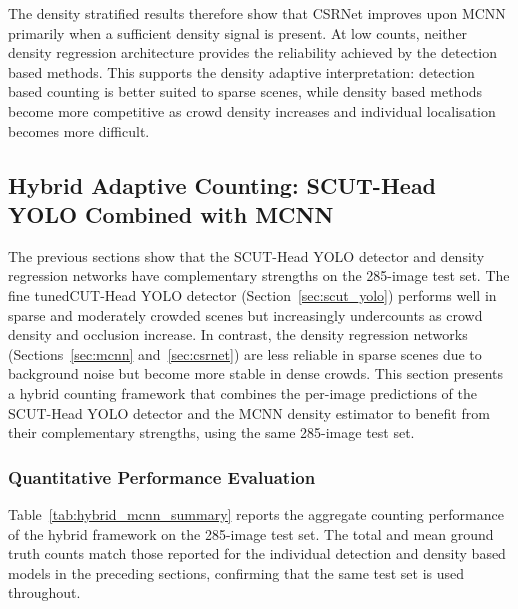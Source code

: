 \documentclass[12pt,a4paper]{report}
\begin{document}
The density stratified results therefore show that CSRNet improves upon MCNN primarily when a sufficient density signal is present. At low counts, neither density regression architecture provides the reliability achieved by the detection based methods. This supports the density adaptive interpretation: detection based counting is better suited to sparse scenes, while density based methods become more competitive as crowd density increases and individual localisation becomes more difficult.

\subsection{Hybrid Adaptive Counting: SCUT-Head YOLO Combined with MCNN}
\label{sec:hybrid_mcnn}

The previous sections show that the SCUT-Head YOLO detector and density regression networks have complementary strengths on the 285-image test set. The fine tunedCUT-Head YOLO detector (Section~\ref{sec:scut_yolo}) performs well in sparse and moderately crowded scenes but increasingly undercounts as crowd density and occlusion increase. In contrast, the density regression networks (Sections~\ref{sec:mcnn} and~\ref{sec:csrnet}) are less reliable in sparse scenes due to background noise but become more stable in dense crowds. This section presents a hybrid counting framework that combines the per-image predictions of the SCUT-Head YOLO detector and the MCNN density estimator to benefit from their complementary strengths, using the same 285-image test set.

\subsubsection{Quantitative Performance Evaluation}

Table~\ref{tab:hybrid_mcnn_summary} reports the aggregate counting performance of the hybrid framework on the 285-image test set. The total and mean ground truth counts match those reported for the individual detection and density based models in the preceding sections, confirming that the same test set is used throughout.
\end{document}
